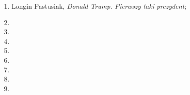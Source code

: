 \documentclass[a4paper,11pt]{article}
\begin{document}
\begin{enumerate}
\item Longin Pastusiak, \textit{Donald Trump. Pierwszy taki prezydent};

\item

\item

\item

\item

\item

\item

\item

\item






\end{enumerate}
\end{document}
